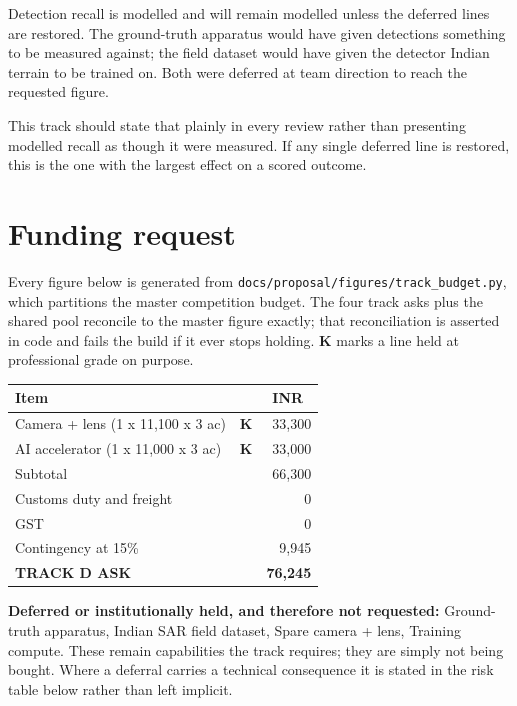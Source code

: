 \documentclass[11pt,a4paper]{article}
\newcommand{\inr}[1]{INR~#1}
\begin{document}
Detection recall is modelled and will remain modelled unless the deferred lines
are restored. The ground-truth apparatus would have given detections something
to be measured against; the field dataset would have given the detector Indian
terrain to be trained on. Both were deferred at team direction to reach the
requested figure.

This track should state that plainly in every review rather than presenting
modelled recall as though it were measured. If any single deferred line is
restored, this is the one with the largest effect on a scored outcome.

\section{Funding request}

Every figure below is generated from
\texttt{docs/proposal/figures/track\_budget.py}, which partitions the master
competition budget. The four track asks plus the shared pool reconcile to the
master figure exactly; that reconciliation is asserted in code and fails the
build if it ever stops holding. \textbf{K} marks a line held at professional
grade on purpose.


\begin{center}
\begin{tabular}{@{}p{88mm}cr@{}}
\toprule
\textbf{Item} & & \textbf{\inr{}} \\
\midrule
Camera + lens (1 x 11,100 x 3 ac) & \textbf{K} & 33,300 \\
AI accelerator (1 x 11,000 x 3 ac) & \textbf{K} & 33,000 \\
\midrule
Subtotal & & 66,300 \\
Customs duty and freight & & 0 \\
GST & & 0 \\
Contingency at 15\% & & 9,945 \\
\midrule
\textbf{TRACK D ASK} & & \textbf{76,245} \\
\bottomrule
\end{tabular}
\end{center}


\textbf{Deferred or institutionally held, and therefore not requested:}
Ground-truth apparatus, Indian SAR field dataset, Spare camera + lens, Training compute. These remain capabilities the track requires; they are simply not being
bought. Where a deferral carries a technical consequence it is stated in the
risk table below rather than left implicit.
\end{document}
